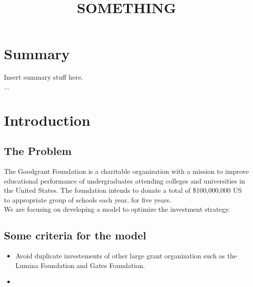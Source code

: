 \documentclass[12pt]{article}
\title{SOMETHING}
\begin{document}
\maketitle

\setcounter{page}{1}
\section*{Summary}
\thispagestyle{empty}
Insert summary stuff here. \\

...



\section{Introduction}
	\subsection{The Problem}
		The Goodgrant Foundation is a charitable organization with a mission 	to improve educational performance of undergraduates attending colleges 		and universities in the United States. The foundation intends to donate 		a total of \$100,000,000 US to appropriate group of schools each year, 			for five years. \\

		We are focusing on developing a model to optimize the investment 			strategy. 

	\subsection{Some criteria for the model}
	\begin{itemize}
		\item Avoid duplicate investements of other large grant organization such as the Lumina Foundation and Gates Foundation. 
		\item 
	\end{itemize}
	
\end{document}
